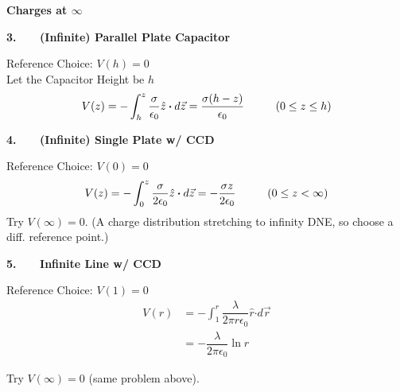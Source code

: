 \documentclass[12pt]{article}
\newcommand*{\dotP}{\boldsymbol \cdot}		%
\begin{document}
\begin{minipage}[t]{0.48\textwidth}
	\noindent \textbf{Charges at \(\infty\)}

	\vspace{30pt}
	\textbf{3. \ \ \ (Infinite) Parallel Plate Capacitor}

	\vspace{15pt}
	Reference Choice: \( V(h) = 0 \)\\[15pt]
	Let the Capacitor Height be \(h\) 
	\[ V( z ) = - \int_{h}^{z} \frac{\sigma}{\epsilon_0} \hat{z} \dotP d\vec{z}
		= \frac{\sigma (h-z)}{\epsilon_0} 
		\ \ \ \ \indent (0 \leq z \leq h)
	\]
	
	\vspace{10pt}
	\textbf{4. \ \ \ (Infinite) Single Plate w/ CCD}

	\vspace{15pt}
	Reference Choice: \( V(0) = 0 \)
	\[ V( z ) = - \int_{0}^{z} \frac{\sigma}{2 \epsilon_0} \hat{z} \dotP d\vec{z}
		= - \frac{\sigma z}{2 \epsilon_0} 
		\ \ \ \ \indent (0 \leq z < \infty) 
	\]
	\hfill \break 
	Try \( V(\infty) = 0 \). (A charge distribution 
		stretching to infinity DNE, so choose a diff. reference point.)
	
	\vspace{20pt}
	\textbf{5. \ \ \ Infinite Line w/ CCD}

	\vspace{15pt}
	Reference Choice: \( V(1) = 0 \)
	\begin{align*}
		V(r) &= - \int_{1}^{r} \dfrac{ \lambda }{2 \pi r \epsilon_0} \hat{r} \dotP d\vec{r} \\
		&= - \dfrac{ \lambda }{2 \pi \epsilon_0} \ln{r}
	\end{align*}

	Try \( V(\infty) = 0 \) (same problem above).
\end{minipage}
\hspace{10pt}
\end{document}
